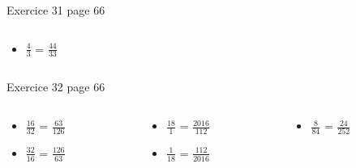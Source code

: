 \documentclass[xcolor={dvipsnames}]{beamer}
\begin{document}
\begin{frame}
\begin{block}{Exercice 31 page 66}
\begin{columns}
		\begin{column}{0.25\textwidth}
			\begin{huge}
				\begin{itemize}
					
					\item $\frac{4}{3}$ = \pause $\frac{44}{33}$\pause					
				\end{itemize}	
			\end{huge}
			
		\end{column}
	\end{columns}		
	
	\end{block}	


	\begin{block}{Exercice 32 page 66}
		\begin{columns}
			\begin{column}{0.25\textwidth}
				\begin{LARGE}
					\begin{itemize}
						\setlength\itemsep{1em}
						\item $\frac{16}{32}$ =  $\frac{63}{126}$ \pause
						
						\item $\frac{32}{16}$ =  $\frac{126}{63}$ \pause
						
						
					\end{itemize}	
				\end{LARGE}
				
			\end{column}
			
			\begin{column}{0.25\textwidth}
				\begin{LARGE}
					\begin{itemize}
						\setlength\itemsep{1em}
						\item $\frac{18}{1}$ = $\frac{2016}{112}$ 
						
						\item $\frac{1}{18}$ = $\frac{112}{2016}$ \pause
						
						
						
					\end{itemize}	
				\end{LARGE}
				
			\end{column}
			
			\begin{column}{0.25\textwidth}
				\begin{LARGE}
					\begin{itemize}
						\setlength\itemsep{1em}
						\item $\frac{8}{84}$ = $\frac{24}{252}$
						

\end{itemize}
\end{LARGE}
\end{column}
\end{columns}
\end{block}
\end{frame}
\end{document}
